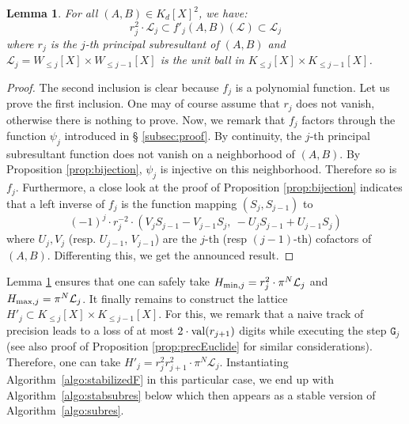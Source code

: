 \documentclass{jT}
\numberwithin{equation}{section}
\DeclareMathOperator{\val}{val}
\newtheorem{lem}[theo]{Lemma}
\theoremstyle{definition}
\newcommand{\calL}{\mathcal L}
\renewcommand{\min}{\text{\rm min}}
\renewcommand{\max}{\text{\rm max}}
\renewcommand{\val}{\text{\rm val}}
\newcommand{\A}{W}
\begin{document}
\begin{lem}
\label{lem:diff}
For all $(A,B) \in K_d[X]^2$, we have:
$$r_j^2 \cdot \mathcal L_j 
\subset f'_j(A,B)(\mathcal L) \subset \mathcal L_j$$
where $r_j$ is the $j$-th principal subresultant of $(A,B)$ and
$\calL_j = \A_{\leq j}[X] \times \A_{\leq j-1}[X]$ is the unit ball
in $K_{\leq j}[X] \times K_{\leq j-1}[X]$.
\end{lem}

\begin{proof}
The second inclusion is clear because $f_j$ is a polynomial function. 
Let us prove the first inclusion. One may of course assume that $r_j$ 
does not vanish, otherwise there is nothing to prove. Now, we remark 
that $f_j$ factors through the function $\psi_j$ introduced in \S 
\ref{subsec:proof}. By continuity, the $j$-th principal subresultant 
function does not vanish on a neighborhood of $(A,B)$. By Proposition 
\ref{prop:bijection}, $\psi_j$ is injective on this neighborhood. 
Therefore so is $f_j$. Furthermore, a close look at the proof of 
Proposition \ref{prop:bijection} indicates that a left inverse of $f_j$ 
is the function mapping $(S_j, S_{j-1})$ to
$$(-1)^j \cdot r_j^{-2} \cdot 
(V_j S_{j-1}{-}V_{j-1} S_j,\: -U_j S_{j-1}{+}U_{j-1} S_j)$$
where $U_j, V_j$ (resp. $U_{j-1}$, $V_{j-1}$) are the $j$-th (resp 
$(j-1)$-th) cofactors of $(A,B)$. Differenting this, we get the
announced result.
\end{proof}

Lemma \ref{lem:diff} ensures that one can safely take $H_{\min,j} = 
r_j^2 \cdot \pi^N \calL_j$ and $H_{\max,j} = \pi^N \calL_j$. It finally 
remains to construct the lattice $H'_j \subset K_{\leq j}[X] \times 
K_{\leq j-1}[X]$. For this, we remark that a naive track of precision 
leads to a loss of at most $2 \cdot \val(r_{j+1})$ digits while 
executing the step $\texttt{G}_j$ (see also proof of Proposition 
\ref{prop:precEuclide} for similar considerations). Therefore, one can 
take $H'_j = r_j^2 r_{j+1}^2 \cdot \pi^N \calL_j$. Instantiating
Algorithm~\ref{algo:stabilizedF} in this particular case, we end up
with Algorithm~\ref{algo:stabsubres} below which then appears as a 
stable version of Algorithm~\ref{algo:subres}.
\end{document}
